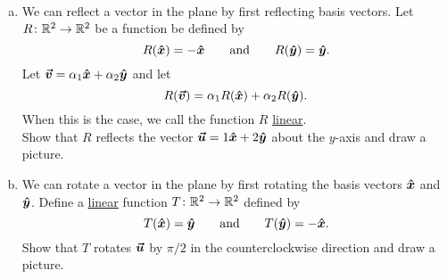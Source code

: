 \documentclass[12pt]{article} %
\begin{document}
\begin{problem}~
\begin{enumerate}[(a)]
    \item We can reflect a vector in the plane by first reflecting basis vectors. Let $R\colon \mathbb{R}^2 \to \mathbb{R}^2$ be a function be defined by 
    \[
    R(\boldsymbol{\hat{x}}) = -\boldsymbol{\hat{x}} \qquad \textrm{and} \qquad R(\boldsymbol{\hat{y}})=\boldsymbol{\hat{y}}.
    \]
    Let $\boldsymbol{\vec{v}} = \alpha_1 \boldsymbol{\hat{x}} + \alpha_2 \boldsymbol{\hat{y}}$ and let
    \[
    R(\boldsymbol{\vec{v}}) = \alpha_1 R(\boldsymbol{\hat{x}}) + \alpha_2 R(\boldsymbol{\hat{y}}).
    \]
    When this is the case, we call the function $R$ \underline{linear}.\\
    \noindent Show that $R$ reflects the vector $\boldsymbol{\vec{u}} = 1\boldsymbol{\hat{x}} + 2\boldsymbol{\hat{y}}$ about the $y$-axis and draw a picture.
    \item We can rotate a vector in the plane by first rotating the basis vectors $\boldsymbol{\hat{x}}$ and $\boldsymbol{\hat{y}}$. Define a \underline{linear} function $T\colon \mathbb{R}^2 \to \mathbb{R}^2$ defined by
    \[
    T(\boldsymbol{\hat{x}})=\boldsymbol{\hat{y}} \qquad \textrm{and} \qquad T(\boldsymbol{\hat{y}})=-\boldsymbol{\hat{x}}.
    \]
    \noindent Show that $T$ rotates $\boldsymbol{\vec{u}}$ by $\pi/2$ in the counterclockwise direction and draw a picture.
\end{enumerate}
\end{problem}
\end{document}
